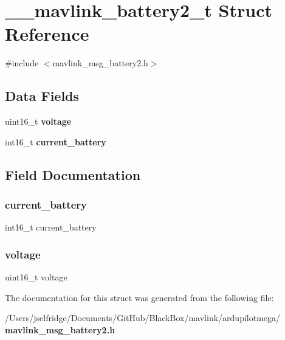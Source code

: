 \section{\+\_\+\+\_\+mavlink\+\_\+battery2\+\_\+t Struct Reference}
\label{struct____mavlink__battery2__t}


{\ttfamily \#include $<$mavlink\+\_\+msg\+\_\+battery2.\+h$>$}

\subsection*{Data Fields}
\begin{DoxyCompactItemize}
\item 
uint16\+\_\+t \textbf{ voltage}
\item 
int16\+\_\+t \textbf{ current\+\_\+battery}
\end{DoxyCompactItemize}


\subsection{Field Documentation}
\mbox{\label{struct____mavlink__battery2__t_ab8daa9374a1b384c0500010a7f3915e2}} 
\subsubsection{current\+\_\+battery}
{\footnotesize\ttfamily int16\+\_\+t current\+\_\+battery}

\mbox{\label{struct____mavlink__battery2__t_a8e84682150888ae78b9a41959ca02c7b}} 
\subsubsection{voltage}
{\footnotesize\ttfamily uint16\+\_\+t voltage}



The documentation for this struct was generated from the following file\+:\begin{DoxyCompactItemize}
\item 
/\+Users/jselfridge/\+Documents/\+Git\+Hub/\+Black\+Box/mavlink/ardupilotmega/\textbf{ mavlink\+\_\+msg\+\_\+battery2.\+h}\end{DoxyCompactItemize}

